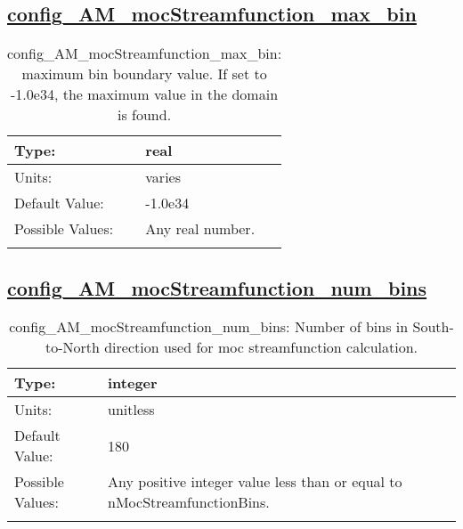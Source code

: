 \subsection[config\_AM\_mocStreamfunction\_max\_bin]{\hyperref[sec:nm_tab_AM_mocStreamfunction]{config\_AM\_mocStreamfunction\_max\_bin}}
\label{subsec:nm_sec_config_AM_mocStreamfunction_max_bin}
\begin{center}
\begin{longtable}{| p{2.0in} || p{4.0in} |}
    \hline
    Type: & real \\
    \hline
    Units: & \si{varies} \\
    \hline
    Default Value: & -1.0e34 \\
    \hline
    Possible Values: & Any real number. \\
    \hline
    \caption{config\_AM\_mocStreamfunction\_max\_bin: maximum bin boundary value.  If set to -1.0e34, the maximum value in the domain is found.}
\end{longtable}
\end{center}
\subsection[config\_AM\_mocStreamfunction\_num\_bins]{\hyperref[sec:nm_tab_AM_mocStreamfunction]{config\_AM\_mocStreamfunction\_num\_bins}}
\label{subsec:nm_sec_config_AM_mocStreamfunction_num_bins}
\begin{center}
\begin{longtable}{| p{2.0in} || p{4.0in} |}
    \hline
    Type: & integer \\
    \hline
    Units: & \si{unitless} \\
    \hline
    Default Value: & 180 \\
    \hline
    Possible Values: & Any positive integer value less than or equal to nMocStreamfunctionBins. \\
    \hline
    \caption{config\_AM\_mocStreamfunction\_num\_bins: Number of bins in South-to-North direction used for moc streamfunction calculation.}
\end{longtable}
\end{center}
